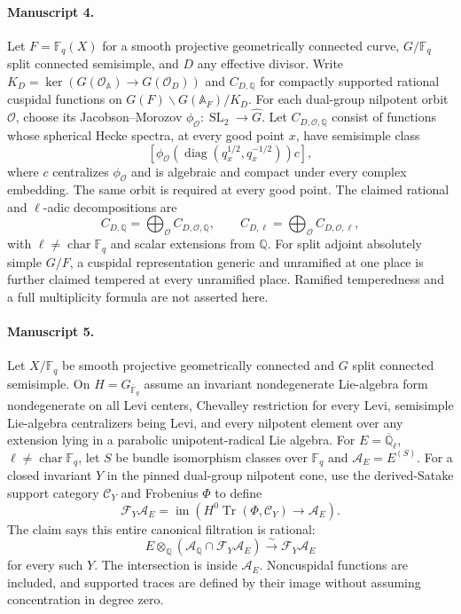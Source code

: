 \documentclass[11pt]{article}
\begin{document}
\paragraph{Manuscript 4.}
Let $F=\mathbb F_q(X)$ for a smooth projective geometrically connected curve, $G/\mathbb F_q$ split connected semisimple, and $D$ any effective divisor. Write $K_D=\ker(G(\mathcal O_{\mathbb A})\to G(\mathcal O_D))$ and $C_{D,\mathbb Q}$ for compactly supported rational cuspidal functions on $G(F)\backslash G(\mathbb A_F)/K_D$. For each dual-group nilpotent orbit $\mathcal O$, choose its Jacobson--Morozov $\phi_{\mathcal O}:\operatorname{SL}_2\to\widehat G$. Let $C_{D,\mathcal O,\mathbb Q}$ consist of functions whose spherical Hecke spectra, at every good point $x$, have semisimple class
\[
 [\phi_{\mathcal O}(\operatorname{diag}(q_x^{1/2},q_x^{-1/2}))c],
\]
where $c$ centralizes $\phi_{\mathcal O}$ and is algebraic and compact under every complex embedding. The same orbit is required at every good point. The claimed rational and $\ell$-adic decompositions are
\[
 C_{D,\mathbb Q}=\bigoplus_{\mathcal O} C_{D,\mathcal O,\mathbb Q},\qquad
 C_{D,\ell}=\bigoplus_{\mathcal O} C_{D,\mathcal O,\ell},
\]
with $\ell\ne\operatorname{char}\mathbb F_q$ and scalar extensions from $\mathbb Q$. For split adjoint absolutely simple $G/F$, a cuspidal representation generic and unramified at one place is further claimed tempered at every unramified place. Ramified temperedness and a full multiplicity formula are not asserted here.

\paragraph{Manuscript 5.}
Let $X/\mathbb F_q$ be smooth projective geometrically connected and $G$ split connected semisimple. On $H=G_{\overline{\mathbb F}_q}$ assume an invariant nondegenerate Lie-algebra form nondegenerate on all Levi centers, Chevalley restriction for every Levi, semisimple Lie-algebra centralizers being Levi, and every nilpotent element over any extension lying in a parabolic unipotent-radical Lie algebra. For $E=\overline{\mathbb Q}_{\ell}$, $\ell\ne\operatorname{char}\mathbb F_q$, let $S$ be bundle isomorphism classes over $\mathbb F_q$ and $\mathcal A_E=E^{(S)}$. For a closed invariant $Y$ in the pinned dual-group nilpotent cone, use the derived-Satake support category $\mathcal C_Y$ and Frobenius $\Phi$ to define
\[
 \mathcal F_Y\mathcal A_E=\operatorname{im}(H^0\operatorname{Tr}(\Phi,\mathcal C_Y)\to\mathcal A_E).
\]
The claim says this entire canonical filtration is rational:
\[
 E\otimes_{\mathbb Q}(\mathcal A_{\mathbb Q}\cap\mathcal F_Y\mathcal A_E)
 \xrightarrow{\sim}\mathcal F_Y\mathcal A_E
\]
for every such $Y$. The intersection is inside $\mathcal A_E$. Noncuspidal functions are included, and supported traces are defined by their image without assuming concentration in degree zero.
\end{document}
